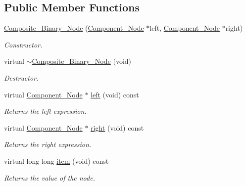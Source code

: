 \subsection*{Public Member Functions}
\begin{DoxyCompactItemize}
\item 
\hyperlink{classMadara_1_1Expression__Tree_1_1Composite__Binary__Node_ace5075689a4b1e549373beaa19a2eb0e}{Composite\_\-Binary\_\-Node} (\hyperlink{classMadara_1_1Expression__Tree_1_1Component__Node}{Component\_\-Node} $\ast$left, \hyperlink{classMadara_1_1Expression__Tree_1_1Component__Node}{Component\_\-Node} $\ast$right)
\begin{DoxyCompactList}\small\item\em Constructor. \item\end{DoxyCompactList}\item 
virtual \hyperlink{classMadara_1_1Expression__Tree_1_1Composite__Binary__Node_acb34deda8eff37c460d310d413e9b3a0}{$\sim$Composite\_\-Binary\_\-Node} (void)
\begin{DoxyCompactList}\small\item\em Destructor. \item\end{DoxyCompactList}\item 
virtual \hyperlink{classMadara_1_1Expression__Tree_1_1Component__Node}{Component\_\-Node} $\ast$ \hyperlink{classMadara_1_1Expression__Tree_1_1Composite__Binary__Node_a6ca5cccbc46ccc6026c18f9665298380}{left} (void) const 
\begin{DoxyCompactList}\small\item\em Returns the left expression. \item\end{DoxyCompactList}\item 
virtual \hyperlink{classMadara_1_1Expression__Tree_1_1Component__Node}{Component\_\-Node} $\ast$ \hyperlink{classMadara_1_1Expression__Tree_1_1Composite__Unary__Node_ade55cde5707e0fa73ab1c019159b9aec}{right} (void) const 
\begin{DoxyCompactList}\small\item\em Returns the right expression. \item\end{DoxyCompactList}\item 
virtual long long \hyperlink{classMadara_1_1Expression__Tree_1_1Component__Node_ac38c35834da00a454c8f876278ad1b99}{item} (void) const 
\begin{DoxyCompactList}\small\item\em Returns the value of the node. \item\end{DoxyCompactList}\item 

\end{DoxyCompactItemize}

